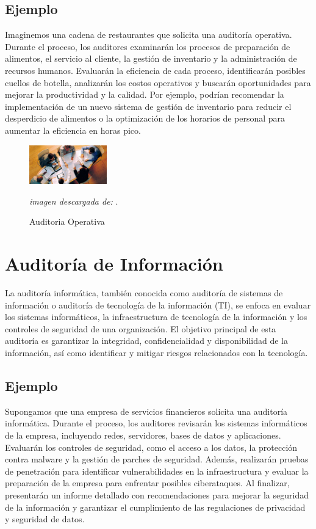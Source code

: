 \documentclass[12pt,a4paper]{article}
\begin{document}
\subsection*{Ejemplo}
Imaginemos una cadena de restaurantes que solicita una auditoría operativa. Durante el proceso, los auditores examinarán los procesos de preparación de alimentos, el servicio al cliente, la gestión de inventario y la administración de recursos humanos. Evaluarán la eficiencia de cada proceso, identificarán posibles cuellos de botella, analizarán los costos operativos y buscarán oportunidades para mejorar la productividad y la calidad. Por ejemplo, podrían recomendar la implementación de un nuevo sistema de gestión de inventario para reducir el desperdicio de alimentos o la optimización de los horarios de personal para aumentar la eficiencia en horas pico.

\begin{figure}[!htb]
    \centering
    \caption{Auditoria Operativa} 

    \includegraphics[width=0.3\textwidth]{images/fig_operativa.jpg}
    \par
    \textit{imagen descargada de:} \cite{fig_operativa}.

\end{figure}

\newpage
\section{Auditoría de Información}
La auditoría informática, también conocida como auditoría de sistemas de información o auditoría de tecnología de la información (TI), se enfoca en evaluar los sistemas informáticos, la infraestructura de tecnología de la información y los controles de seguridad de una organización. El objetivo principal de esta auditoría es garantizar la integridad, confidencialidad y disponibilidad de la información, así como identificar y mitigar riesgos relacionados con la tecnología.
\cite{audit_sofware}

\subsection*{Ejemplo}
Supongamos que una empresa de servicios financieros solicita una auditoría informática. Durante el proceso, los auditores revisarán los sistemas informáticos de la empresa, incluyendo redes, servidores, bases de datos y aplicaciones. Evaluarán los controles de seguridad, como el acceso a los datos, la protección contra malware y la gestión de parches de seguridad. Además, realizarán pruebas de penetración para identificar vulnerabilidades en la infraestructura y evaluar la preparación de la empresa para enfrentar posibles ciberataques. Al finalizar, presentarán un informe detallado con recomendaciones para mejorar la seguridad de la información y garantizar el cumplimiento de las regulaciones de privacidad y seguridad de datos.
\end{document}
